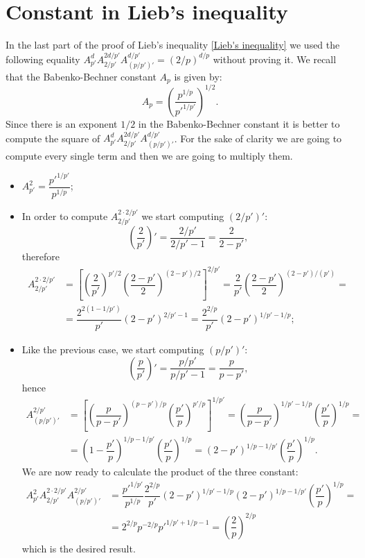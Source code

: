 \documentclass[corpo=11pt, stile=classica, tipotesi=custom,
greek, evenboxes, english]{toptesi}
\numberwithin{equation}{chapter}
\theoremstyle{remark}
\begin{document}
\section{Constant in Lieb's inequality}\label{constant in Lieb's inequality calculation}
In the last part of the proof of Lieb's inequality \ref{Lieb's inequality} we used the following equality $A_{p'}^d A_{2/p'}^{2d/p'}A_{(p/p')'}^{d/p'}=(2/p)^{d/p}$ without proving it. We recall that the Babenko-Bechner constant $A_p$ is given by:
\begin{equation*}
	A_p = \left(\dfrac{p^{1/p}}{p'^{1/p'}}\right)^{1/2}.
\end{equation*}
Since there is an exponent $1/2$ in the Babenko-Bechner constant it is better to compute the square of $A_{p'}^d A_{2/p'}^{2d/p'}A_{(p/p')'}^{d/p'}$. For the sake of clarity we are going to compute every single term and then we are going to multiply them.
\begin{itemize}
	\item $\displaystyle A_{p'}^2 = \dfrac{p'^{1/p'}}{p^{1/p}}$;
	\item In order to compute $A_{2/p'}^{2\cdot 2/p'}$ we start computing $(2/p')'$:
	\begin{equation*}
		\left(\dfrac{2}{p'}\right)' = \dfrac{2/p'}{2/p'-1} = \dfrac{2}{2-p'},
	\end{equation*}
	therefore
	\begin{align*}
		A_{2/p'}^{2\cdot 2/p'} &= \left[  \left(\dfrac{2}{p'}\right)^{p'/2} \left(\dfrac{2-p'}{2}\right)^{(2-p')/2}\right]^{2/p'} = \dfrac{2}{p'} \left(\dfrac{2-p'}{2}\right)^{(2-p')/(p')} = \\
							   &= \dfrac{2^{2(1-1/p')}}{p'}(2-p')^{2/p'-1} = \dfrac{2^{2/p}}{p'} (2-p')^{1/p'-1/p};
	\end{align*}
	\item Like the previous case, we start computing $(p/p')'$:
	\begin{equation*}
		\left(\dfrac{p}{p'}\right)' = \dfrac{p/p'}{p/p'-1} = \dfrac{p}{p-p'},
	\end{equation*}
	hence
	\begin{align*}
		A_{(p/p')'}^{2/p'} &= \left[ \left(\dfrac{p}{p-p'}\right)^{(p-p')/p} \left(\dfrac{p'}{p}\right)^{p'/p}\right]^{1/p'} = \left(\dfrac{p}{p-p'}\right)^{1/p' - 1/p} \left(\dfrac{p'}{p}\right)^{1/p} = \\
						   &= \left(1-\dfrac{p'}{p}\right)^{1/p-1/p'} \left(\dfrac{p'}{p}\right)^{1/p} = (2-p')^{1/p-1/p'}\left(\dfrac{p'}{p}\right)^{1/p}.
	\end{align*}
	We are now ready to calculate the product of the three constant:
	\begin{align*}
		A_{p'}^2 A_{2/p'}^{2 \cdot 2/p'} A_{(p/p')'}^{2/p'} &= \dfrac{p'^{1/p'}}{p^{1/p}} \dfrac{2^{2/p}}{p'} (2-p')^{1/p'-1/p} (2-p')^{1/p-1/p'}\left(\dfrac{p'}{p}\right)^{1/p} = \\
															&= 2^{2/p} p^{-2/p}p'^{1/p'+1/p-1} = \left(\dfrac{2}{p}\right)^{2/p}
	\end{align*}
	which is the desired result.
\end{itemize}
\end{document}
